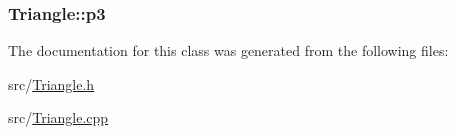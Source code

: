 \subsubsection[{\texorpdfstring{p3}{p3}}]{ Triangle\+::p3\hspace{0.3cm}{\ttfamily [private]}}\hypertarget{classTriangle_a600c7366c1dad8996026742eb12434c6}{}\label{classTriangle_a600c7366c1dad8996026742eb12434c6}


The documentation for this class was generated from the following files\+:\begin{DoxyCompactItemize}
\item 
src/\hyperlink{Triangle_8h}{Triangle.\+h}\item 
src/\hyperlink{Triangle_8cpp}{Triangle.\+cpp}\end{DoxyCompactItemize}
